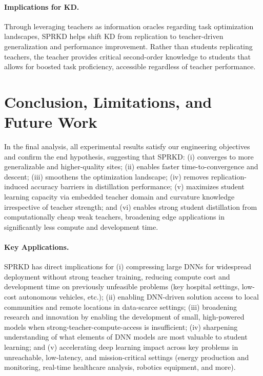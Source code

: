 \documentclass[letterpaper]{article}
\begin{document}
\paragraph{Implications for KD.}
Through leveraging teachers as information oracles regarding task optimization landscapes, SPRKD helps shift KD from replication to teacher-driven generalization and performance improvement. Rather than students replicating teachers, the teacher provides critical second-order knowledge to students that allows for boosted task proficiency, accessible regardless of teacher performance.

\section{Conclusion, Limitations, and Future Work}

In the final analysis, all experimental results satisfy our engineering objectives and confirm the end hypothesis, suggesting that SPRKD: (i) converges to more generalizable and higher-quality sites; (ii) enables faster time-to-convergence and descent; (iii) smoothens the optimization landscape; (iv) removes replication-induced accuracy barriers in distillation performance; (v) maximizes student learning capacity via embedded teacher domain and curvature knowledge irrespective of teacher strength; and (vi) enables strong student distillation from computationally cheap weak teachers, broadening edge applications in significantly less compute and development time.

\paragraph{Key Applications.}
SPRKD has direct implications for (i) compressing large DNNs for widespread deployment without strong teacher training, reducing compute cost and development time on previously unfeasible problems (key hospital settings, low-cost autonomous vehicles, etc.); (ii) enabling DNN-driven solution access to local communities and remote locations in data-scarce settings; (iii) broadening research and innovation by enabling the development of small, high-powered models when strong-teacher-compute-access is insufficient; (iv) sharpening understanding of what elements of DNN models are most valuable to student learning; and (v) accelerating deep learning impact across key problems in unreachable, low-latency, and mission-critical settings (energy production and monitoring, real-time healthcare analysis, robotics equipment, and more).
\end{document}
